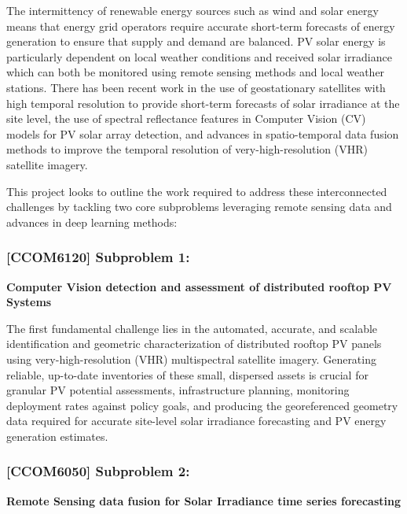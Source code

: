 \begin{multicols}{2}
The intermittency of renewable energy sources such as wind and solar energy means that energy grid operators require accurate short-term forecasts of energy generation to ensure that supply and demand are balanced. PV solar energy is particularly dependent on local weather conditions and received solar irradiance which can both be monitored using 
remote sensing methods and local weather stations. There has been recent work in the use of geostationary satellites with high temporal resolution to provide short-term forecasts of solar irradiance at the site level\cite{Bansal_ssl_nowcasting_2022}, 
the use of spectral reflectance features in Computer Vision (CV) models for PV solar array detection\cite{He_universal_pv_spectral_index_2024}, and advances in spatio-temporal data fusion methods to improve the temporal resolution of very-high-resolution (VHR) satellite imagery\cite{Tremenbert_Kasmi_pyPV_roof_2023}. 

This project looks to outline the work required to address these interconnected challenges by tackling two core subproblems leveraging remote sensing data and advances in deep learning methods:
\end{multicols}

\subsubsection{[CCOM6120] Subproblem 1:}
    \textbf{Computer Vision detection and assessment of distributed rooftop PV Systems} 

    The first fundamental challenge lies in the automated, accurate, and scalable identification and geometric characterization of distributed rooftop PV panels using very-high-resolution (VHR) multispectral satellite imagery. 
    Generating reliable, up-to-date inventories of these small, dispersed assets is crucial for granular PV potential assessments\cite{Pueblas_workflow_rooftop_PV_assessment_sat_img_2023}\cite{Jiang_rooftop_pv_assessment_2022}, infrastructure planning, 
    monitoring deployment rates against policy goals\cite{de-Hoog_sota_survey_2020}, and producing the georeferenced geometry data required for accurate site-level solar irradiance forecasting and PV energy generation estimates\cite{Bansal_ssl_nowcasting_2022}.
    
\subsubsection{[CCOM6050] Subproblem 2:} 
    \textbf{Remote Sensing data fusion for Solar Irradiance time series forecasting} 

